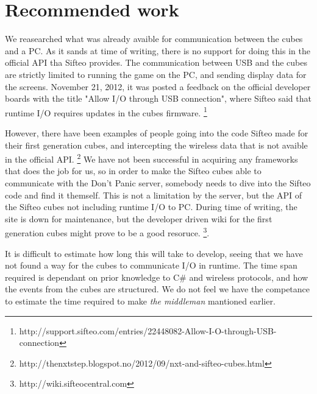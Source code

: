 

\section{Recommended work}

We reasearched what was already avaible for communication between the cubes and a PC. As it sands at time of writing, there is no support for doing this in the official API tha Sifteo provides. The communication between USB and the cubes are strictly limited to running the game on the PC, and sending display data for the screens. November 21, 2012, it was posted a feedback on the official developer boards with the title "Allow I/O through USB connection", where Sifteo said that runtime I/O requires updates in the cubes firmware. 
\footnote{http://support.sifteo.com/entries/22448082-Allow-I-O-through-USB-connection}

However, there have been examples of people going into the code Sifteo made for their first generation cubes, and intercepting the wireless data that is not avaible in the official API. \footnote{http://thenxtstep.blogspot.no/2012/09/nxt-and-sifteo-cubes.html} We have not been successful in acquiring any frameworks that does the job for us, so in order to make the Sifteo cubes able to communicate with the Don't Panic server, somebody needs to dive into the Sifteo code and find it themself. This is not a limitation by the server, but the API of the Sifteo cubes not including runtime I/O to PC. During time of writing, the site is down for maintenance, but the developer driven wiki for the first generation cubes might prove to be a good resoruce. \footnote{http://wiki.sifteocentral.com}.

It is difficult to estimate how long this will take to develop, seeing that we have not found a way for the cubes to communicate I/O in runtime. The time span required is dependant on prior knowledge to C\# and wireless protocols, and how the events from the cubes are structured. We do not feel we have the competance to estimate the time required to make \emph{the middleman} mantioned earlier.
